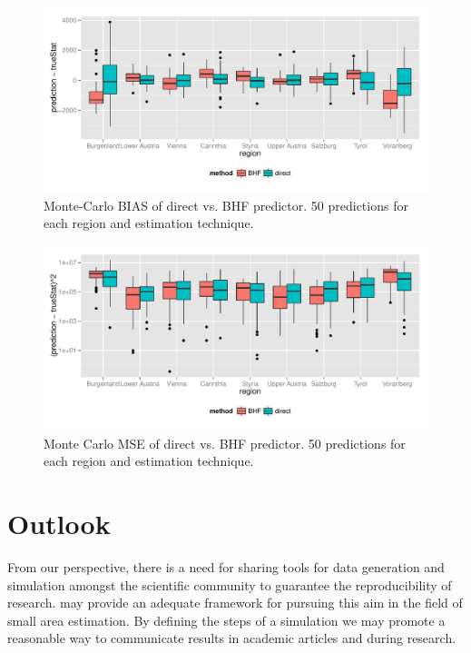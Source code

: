 \documentclass[article]{ajs}
\begin{document}
\begin{figure}[!h]
\includegraphics[width = \textwidth]{saeSim-designSimBIAS.pdf}
\caption{Monte-Carlo BIAS of direct vs. BHF predictor. 50 predictions for each region and estimation technique.}
\label{fig:dbBIAS}
\end{figure}



\begin{figure}[!h]
\includegraphics[width = \textwidth]{saeSim-designSimMSE.pdf}
\caption{Monte Carlo MSE of direct vs. BHF predictor. 50 predictions for each region and estimation technique.}
\label{fig:dbMSE}
\end{figure}
\clearpage

  
\section{Outlook}
\label{sec:outlook}
From our perspective, there is a need for sharing tools for data generation and simulation amongst the scientific community to guarantee the reproducibility of research.  may provide an adequate framework for pursuing this aim in the field of small area estimation. By defining the steps of a simulation we may promote a reasonable way to communicate results in academic articles and during research. 
\end{document}
